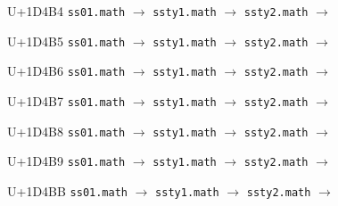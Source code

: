 \documentclass{article}
\begin{document}
\begin{substitutions}
\goodbreak

U+1D4B4  \linebreak
    \texttt{ss01.math} $\to$  \linebreak
    \texttt{ssty1.math} $\to$  \linebreak
    \texttt{ssty2.math} $\to$  

\goodbreak

U+1D4B5  \linebreak
    \texttt{ss01.math} $\to$  \linebreak
    \texttt{ssty1.math} $\to$  \linebreak
    \texttt{ssty2.math} $\to$  

\goodbreak

U+1D4B6  \linebreak
    \texttt{ss01.math} $\to$  \linebreak
    \texttt{ssty1.math} $\to$  \linebreak
    \texttt{ssty2.math} $\to$  

\goodbreak

U+1D4B7  \linebreak
    \texttt{ss01.math} $\to$  \linebreak
    \texttt{ssty1.math} $\to$  \linebreak
    \texttt{ssty2.math} $\to$  

\goodbreak

U+1D4B8  \linebreak
    \texttt{ss01.math} $\to$  \linebreak
    \texttt{ssty1.math} $\to$  \linebreak
    \texttt{ssty2.math} $\to$  

\goodbreak

U+1D4B9  \linebreak
    \texttt{ss01.math} $\to$  \linebreak
    \texttt{ssty1.math} $\to$  \linebreak
    \texttt{ssty2.math} $\to$  

\goodbreak

U+1D4BB  \linebreak
    \texttt{ss01.math} $\to$  \linebreak
    \texttt{ssty1.math} $\to$  \linebreak
    \texttt{ssty2.math} $\to$  


\end{substitutions}
\end{document}
